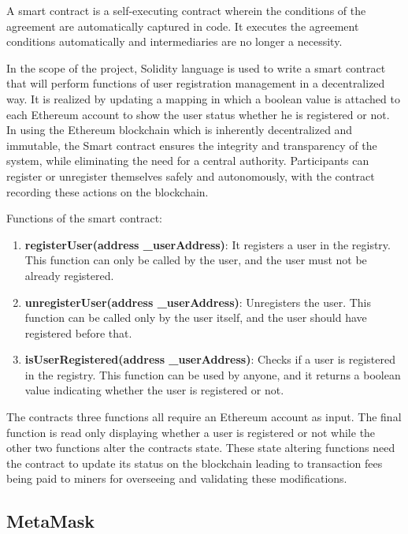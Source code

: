 A smart contract is a self-executing contract wherein the conditions of the agreement are automatically captured in code. It executes the agreement conditions automatically 
and intermediaries are no longer a necessity. 

In the scope of the project, Solidity language is used to write a smart contract that will perform functions of user registration management in a decentralized way. It is 
realized by updating a mapping in which a boolean value is attached to each Ethereum account to show the user status whether he is registered or not. In using the Ethereum 
blockchain which is inherently decentralized and immutable, the Smart contract ensures the integrity and transparency of the system, while eliminating the need for a central
authority. Participants can register or unregister themselves safely and autonomously, with the contract recording these actions on the blockchain. 

Functions of the smart contract:

\begin{enumerate}
  \item \textbf{registerUser(address \_userAddress)}: It registers a user in the registry. This function can only be called by the user, and the user must not be already registered.
  \item \textbf{unregisterUser(address \_userAddress)}: Unregisters the user. This function can be called only by the user itself, and the user should have registered before that.
  \item \textbf{isUserRegistered(address \_userAddress)}: Checks if a user is registered in the registry. This function can be used by anyone, and it returns a boolean 
  value indicating whether the user is registered or not.
\end{enumerate}

The contracts three functions all require an Ethereum account as input. The final function is read only displaying whether a user is registered or not while the other two 
functions alter the contracts state. These state altering functions need the contract to update its status on the blockchain leading to transaction fees being paid to 
miners for overseeing and validating these modifications.



\subsection{MetaMask}

